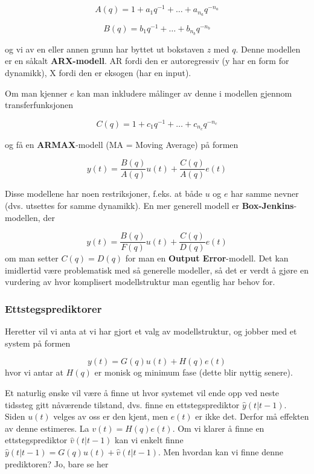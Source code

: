 \begin{equation}
	A(q)=1+a_{1} q^{-1}+\ldots+a_{n_{a}} q^{-n_{a}}
\end{equation}

\begin{equation}
	B(q)=b_{1} q^{-1}+\ldots+b_{n_{b}} q^{-n_{b}}
\end{equation}

og vi av en eller annen grunn har byttet ut bokstaven $z$ med $q$. Denne modellen er en såkalt \textbf{ARX-modell}. AR fordi den er autoregressiv (y har en form for dynamikk), X fordi den er eksogen (har en input).

Om man kjenner $e$ kan man inkludere målinger av denne i modellen gjennom transferfunksjonen

\begin{equation}
	C(q)=1+c_{1} q^{-1}+\ldots+c_{n_{c}} q^{-n_{c}}
\end{equation}

og få en \textbf{ARMAX}-modell (MA = Moving Average) på formen

\begin{equation}
	y(t) = \frac{B(q)}{A(q)} u(t) + \frac{C(q)}{A(q)}e(t)
\end{equation}

Disse modellene har noen restriksjoner, f.eks. at både $u$ og $e$ har samme nevner (dvs. utsettes for samme dynamikk). En mer generell modell er \textbf{Box-Jenkins}-modellen, der

\begin{equation}
	y(t)=\frac{B(q)}{F(q)} u(t)+\frac{C(q)}{D(q)} e(t)
\end{equation}
om man setter $C(q) = D(q)$ for man en \textbf{Output Error}-modell. Det kan imidlertid være problematisk med så generelle modeller, så det er verdt å gjøre en vurdering av hvor komplisert modellstruktur man egentlig har behov for. 

\subsubsection{Ettstegsprediktorer}
Heretter vil vi anta at vi har gjort et valg av modellstruktur, og jobber med et system på formen

\begin{equation}
	y(t) = G(q) u(t) + H(q) e(t)
\end{equation}
hvor vi antar at $H(q)$ er monisk og minimum fase (dette blir nyttig senere).

Et naturlig ønske vil være å finne ut hvor systemet vil ende opp ved neste tidssteg gitt nåværende tilstand, dvs. finne en ettstegsprediktor $\hat{y}(t | t-1)$. Siden $u(t)$ velges av oss er den kjent, men $e(t)$ er ikke det. Derfor må effekten av denne estimeres. La $v(t) = H(q) e(t)$. Om vi klarer å finne en ettstegsprediktor $\hat{v}(t | t-1)$ kan vi enkelt finne $\hat{y}(t | t-1) = G(q) u(t) + \hat{v}(t | t-1)$. Men hvordan kan vi finne denne prediktoren? Jo, bare se her

